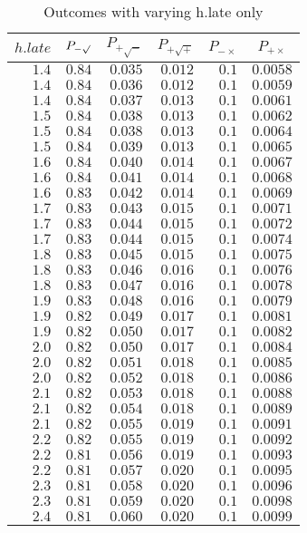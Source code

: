 %
\begin{table}[\hbtp]
 \small
 \begin{center}
 \begin{tabular}{rrrrrr}\hline\hline
\multicolumn{1}{c}{$h.late$}&\multicolumn{1}{c}{$P_{-\surd}$}&\multicolumn{1}{c}{$P_{+\surd - }$}&\multicolumn{1}{c}{$P_{+\surd +}$}&\multicolumn{1}{c}{$P_{-\times}$}&\multicolumn{1}{c}{$P_{+\times}$}\tabularnewline
\hline
$1.4$&$0.84$&$0.035$&$0.012$&$0.1$&$0.0058$\tabularnewline
$1.4$&$0.84$&$0.036$&$0.012$&$0.1$&$0.0059$\tabularnewline
$1.4$&$0.84$&$0.037$&$0.013$&$0.1$&$0.0061$\tabularnewline
$1.5$&$0.84$&$0.038$&$0.013$&$0.1$&$0.0062$\tabularnewline
$1.5$&$0.84$&$0.038$&$0.013$&$0.1$&$0.0064$\tabularnewline
$1.5$&$0.84$&$0.039$&$0.013$&$0.1$&$0.0065$\tabularnewline
$1.6$&$0.84$&$0.040$&$0.014$&$0.1$&$0.0067$\tabularnewline
$1.6$&$0.84$&$0.041$&$0.014$&$0.1$&$0.0068$\tabularnewline
$1.6$&$0.83$&$0.042$&$0.014$&$0.1$&$0.0069$\tabularnewline
$1.7$&$0.83$&$0.043$&$0.015$&$0.1$&$0.0071$\tabularnewline
$1.7$&$0.83$&$0.044$&$0.015$&$0.1$&$0.0072$\tabularnewline
$1.7$&$0.83$&$0.044$&$0.015$&$0.1$&$0.0074$\tabularnewline
$1.8$&$0.83$&$0.045$&$0.015$&$0.1$&$0.0075$\tabularnewline
$1.8$&$0.83$&$0.046$&$0.016$&$0.1$&$0.0076$\tabularnewline
$1.8$&$0.83$&$0.047$&$0.016$&$0.1$&$0.0078$\tabularnewline
$1.9$&$0.83$&$0.048$&$0.016$&$0.1$&$0.0079$\tabularnewline
$1.9$&$0.82$&$0.049$&$0.017$&$0.1$&$0.0081$\tabularnewline
$1.9$&$0.82$&$0.050$&$0.017$&$0.1$&$0.0082$\tabularnewline
$2.0$&$0.82$&$0.050$&$0.017$&$0.1$&$0.0084$\tabularnewline
$2.0$&$0.82$&$0.051$&$0.018$&$0.1$&$0.0085$\tabularnewline
$2.0$&$0.82$&$0.052$&$0.018$&$0.1$&$0.0086$\tabularnewline
$2.1$&$0.82$&$0.053$&$0.018$&$0.1$&$0.0088$\tabularnewline
$2.1$&$0.82$&$0.054$&$0.018$&$0.1$&$0.0089$\tabularnewline
$2.1$&$0.82$&$0.055$&$0.019$&$0.1$&$0.0091$\tabularnewline
$2.2$&$0.82$&$0.055$&$0.019$&$0.1$&$0.0092$\tabularnewline
$2.2$&$0.81$&$0.056$&$0.019$&$0.1$&$0.0093$\tabularnewline
$2.2$&$0.81$&$0.057$&$0.020$&$0.1$&$0.0095$\tabularnewline
$2.3$&$0.81$&$0.058$&$0.020$&$0.1$&$0.0096$\tabularnewline
$2.3$&$0.81$&$0.059$&$0.020$&$0.1$&$0.0098$\tabularnewline
$2.4$&$0.81$&$0.060$&$0.020$&$0.1$&$0.0099$\tabularnewline
\hline
\end{tabular}

\end{center}

\caption{Outcomes with varying h.late only\label{tbl:h.late_varying_only}} 

\end{table}

